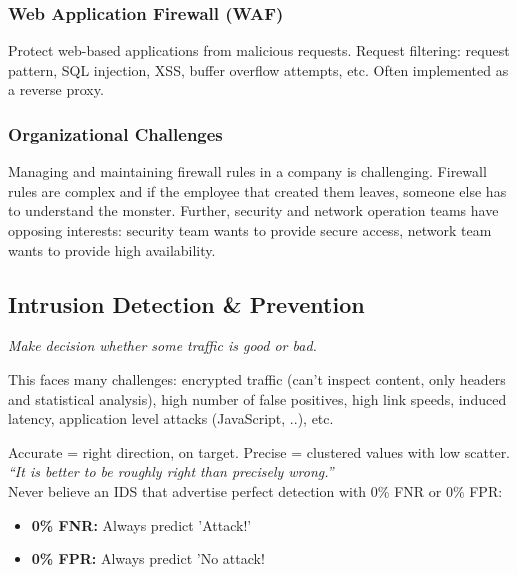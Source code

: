 \documentclass[11pt,oneside,a4paper]{article}
\begin{document}
\subsubsection{Web Application Firewall (WAF)}

Protect web-based applications from malicious requests. Request filtering: request pattern, SQL injection, XSS, buffer overflow attempts, etc. Often implemented as a reverse proxy.

\subsubsection{Organizational Challenges}

Managing and maintaining firewall rules in a company is challenging. Firewall rules are complex and if the employee that created them leaves, someone else has to understand the monster. Further, security and network operation teams have opposing interests: security team wants to provide secure access, network team wants to provide high availability.

\subsection{Intrusion Detection \& Prevention}

\textit{Make decision whether some traffic is good or bad.}

\noindent This faces many challenges: encrypted traffic (can't inspect content, only headers and statistical analysis), high number of false positives, high link speeds, induced latency, application level attacks (JavaScript, ..), etc.

\noindent Accurate = right direction, on target. Precise = clustered values with low scatter.\\

\textit{“It is better to be roughly right than precisely wrong.”}\\

\noindent Never believe an IDS that advertise perfect detection with 0\% FNR or 0\% FPR:

\vspace{-\topsep}
\begin{itemize}
	\setlength{\itemsep}{0pt}
	\setlength{\parskip}{0pt}
	\item \textbf{0\% FNR:} Always predict 'Attack!'
	\item \textbf{0\% FPR:} Always predict 'No attack!
\end{itemize}
\vspace{-\topsep}
\end{document}
